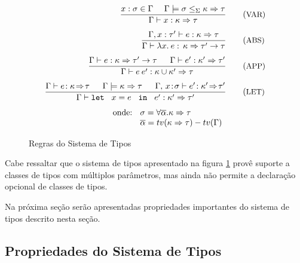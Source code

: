 \begin{figure}[h]
 \vspace{.5cm}
\begin{align}
   \frac{x:\sigma \in \Gamma \:\:\:\:\:\: \Gamma \models \sigma \leq_{\Sigma} \kappa\Rightarrow\tau}
        {\Gamma \vdash x: \kappa\Rightarrow \tau} & \tag{\small{VAR}} \\[.2cm] 
   \frac{\Gamma,x:\tau' \vdash e: \kappa \Rightarrow \tau} 
        {\Gamma \vdash \lambda x.\:e:\,\kappa\Rightarrow \tau' \rightarrow \tau} & \tag{\small{ABS}}\\[.2cm] 
   \frac{\Gamma \vdash e: \kappa \Rightarrow \tau' \rightarrow \tau \:\:\:\:\:\:\:
         \Gamma \vdash e': \kappa' \Rightarrow \tau'}
        {\Gamma \vdash e\:e': \kappa\cup \kappa'\Rightarrow \tau} & \tag{\small{APP}}\\[.2cm] 
   \frac{\Gamma \vdash e\!:\kappa\!\Rightarrow\!\tau \:\:\:\:\:\:\: \Gamma \models \kappa\Rightarrow\tau
         \:\:\:\:\:\:\:
         \Gamma,\,x\!:\!\sigma \vdash e'\!:\kappa'\!\Rightarrow\!\tau'}
        {\Gamma \vdash \text{\texttt{let }}\ x=e\ \text{\texttt{ in }}\ e':\kappa'\Rightarrow\tau'} & \tag{\small{LET}} \\[.2cm]
       \text{onde: }\begin{array}[t]{l}
	                    \sigma = \forall\overline{\alpha}.\kappa\Rightarrow\tau \\ 
                        \overline{\alpha} = tv(\kappa\Rightarrow \tau)-tv(\Gamma) 
					 \end{array} & \notag
\end{align}
\caption{Regras do Sistema de Tipos}
\label{figtyperules}
\end{figure}

Cabe ressaltar que o sistema de tipos apresentado na figura \ref{figtyperules} prov\^e suporte a classes de tipos 
com m\'ultiplos par\^ametros, mas ainda n\~ao permite a declara\c{c}\~ao opcional de classes de tipos.

Na pr\'oxima se\c{c}\~ao ser\~ao apresentadas propriedades importantes do sistema de tipos descrito nesta se\c{c}\~ao.

\subsection{Propriedades do Sistema de Tipos}\label{tipotipagem}

